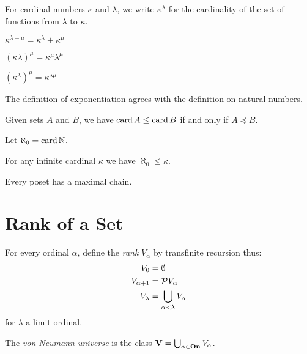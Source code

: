 \begin{definition}
    For cardinal numbers $\kappa$ and $\lambda$, we write $\kappa^\lambda$
    for the cardinality of the set of functions from $\lambda$ to $\kappa$.
\end{definition}

\begin{theorem}
    $\kappa^{\lambda + \mu} = \kappa^\lambda + \kappa^\mu$
\end{theorem}

\begin{theorem}
    $(\kappa \lambda)^\mu = \kappa^\mu \lambda^\mu$
\end{theorem}

\begin{theorem}
    $(\kappa^\lambda)^\mu = \kappa^{\lambda \mu}$
\end{theorem}

\begin{theorem}
    The definition of exponentiation agrees with the definition on natural numbers.
\end{theorem}

\begin{theorem}
    Given sets $A$ and $B$, we have $\operatorname{card} A \leq \operatorname{card} B$ if and only if
    $A \preccurlyeq B$.
\end{theorem}

\begin{definition}
    Let $\aleph_0 = \operatorname{card} \mathbb{N}$.
\end{definition}

\begin{theorem}[AC]
    For any infinite cardinal $\kappa$ we have $\aleph_0 \leq \kappa$.
\end{theorem}

\begin{theorem}
    Every poset has a maximal chain.
\end{theorem}

\section{Rank of a Set}

\begin{definition}
    For every ordinal $\alpha$, define the \emph{rank} $V_\alpha$
    by transfinite recursion thus:
    \begin{align*}
        V_0 & = \emptyset \\
        V_{\alpha + 1} & = \mathcal{P} V_\alpha \\
        V_\lambda & = \bigcup_{\alpha < \lambda} V_\alpha
    \end{align*}
    for $\lambda$ a limit ordinal.

    The \emph{von Neumann universe} is the class $\mathbf{V} = \bigcup_{\alpha \in \mathbf{On}} V_\alpha$.
\end{definition}

